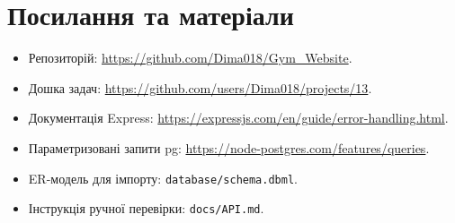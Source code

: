 \documentclass[12pt,a4paper]{article}
\newcommand{\ProjectRepo}{\url{https://github.com/Dima018/Gym_Website}}
\newcommand{\ProjectBoard}{\url{https://github.com/users/Dima018/projects/13}}
\newcommand{\file}[1]{\texttt{#1}}
\begin{document}
\section{Посилання та матеріали}
\begin{itemize}
\item Репозиторій: \ProjectRepo.
\item Дошка задач: \ProjectBoard.
\item Документація Express: \url{https://expressjs.com/en/guide/error-handling.html}.
\item Параметризовані запити pg: \url{https://node-postgres.com/features/queries}.
\item ER-модель для імпорту: \file{database/schema.dbml}.
\item Інструкція ручної перевірки: \file{docs/API.md}.
\end{itemize}
\end{document}
